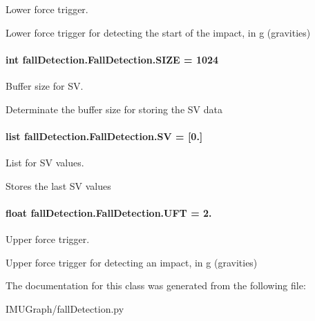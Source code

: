 Lower force trigger. 

Lower force trigger for detecting the start of the impact, in g (gravities) \hypertarget{classfall_detection_1_1_fall_detection_aa99e61fc17e5b0a0e42c148be47ffdd5}{
\paragraph[{S\-I\-Z\-E}]{\setlength{\rightskip}{0pt plus 5cm}int fall\-Detection.\-Fall\-Detection.\-S\-I\-Z\-E = 1024\hspace{0.3cm}{\ttfamily [static]}}}\label{classfall_detection_1_1_fall_detection_aa99e61fc17e5b0a0e42c148be47ffdd5}


Buffer size for S\-V. 

Determinate the buffer size for storing the S\-V data \hypertarget{classfall_detection_1_1_fall_detection_a343631714c9cc3129eaa46abe5c5db82}{
\paragraph[{S\-V}]{\setlength{\rightskip}{0pt plus 5cm}list fall\-Detection.\-Fall\-Detection.\-S\-V = \mbox{[}0.\mbox{]}\hspace{0.3cm}{\ttfamily [static]}}}\label{classfall_detection_1_1_fall_detection_a343631714c9cc3129eaa46abe5c5db82}


List for S\-V values. 

Stores the last S\-V values \hypertarget{classfall_detection_1_1_fall_detection_a34f4c16af8de8c4efaf6779c46ef5f48}{
\paragraph[{U\-F\-T}]{\setlength{\rightskip}{0pt plus 5cm}float fall\-Detection.\-Fall\-Detection.\-U\-F\-T = 2.\hspace{0.3cm}{\ttfamily [static]}}}\label{classfall_detection_1_1_fall_detection_a34f4c16af8de8c4efaf6779c46ef5f48}


Upper force trigger. 

Upper force trigger for detecting an impact, in g (gravities) 

The documentation for this class was generated from the following file\-:\begin{DoxyCompactItemize}
\item 
I\-M\-U\-Graph/fall\-Detection.\-py\end{DoxyCompactItemize}
